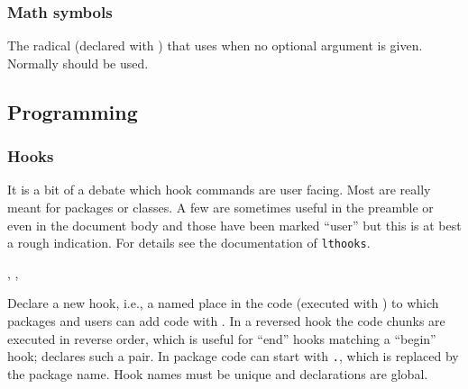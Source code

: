 \documentclass{l3in2edoc}
\begin{document}
\subsubsection{Math symbols}


\begin{function}[]
  {
    \sqrtsign
  }
  \begin{syntax}
     
  \end{syntax}
  The radical (declared with ) that 
  uses when no optional argument is given. Normally  should
  be used.
\end{function}



\subsection{Programming}



\subsubsection{Hooks}

It is a bit of a debate which hook commands are user facing. Most are
really meant for packages or classes.  A few are sometimes useful in
the preamble or even in the document body and those have been marked
\enquote{user} but this is at best a rough indication. For details see
the documentation of \texttt{lthooks}.

\begin{function}[]
  {
    \NewHook,
    \NewReversedHook,
    \NewMirroredHookPair
  }
  \begin{syntax}
     
     
      
  \end{syntax}
  Declare a new hook, i.e., a named place in the code (executed with
  ) to which packages and users can add code with
  . In a reversed hook the code chunks are executed in
  reverse order, which is useful for \enquote{end} hooks matching a
  \enquote{begin} hook;  declares such a pair.
  In package code  can start with \texttt{.}, which is
  replaced by the package name. Hook names must be unique and
  declarations are global.
\end{function}
\end{document}
